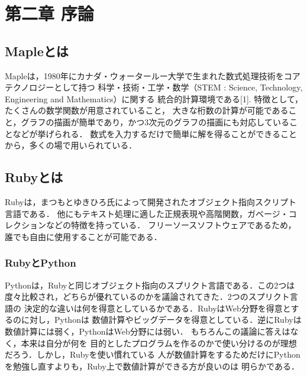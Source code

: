\section{第二章 序論}
\subsection{Mapleとは}
Mapleは，1980年にカナダ・ウォータールー大学で生まれた数式処理技術をコアテクノロジーとして持つ
科学・技術・工学・数学（STEM : Science, Technology, Engineering and Mathematics）に関する
統合的計算環境である[1].
特徴として，たくさんの数学関数が用意されていること，
大きな桁数の計算が可能であること，グラフの描画が簡単であり，かつ3次元のグラフの描画にも対応していることなどが挙げられる．
数式を入力するだけで簡単に解を得ることができることから，多くの場で用いられている．

\subsection{Rubyとは}
Rubyは，まつもとゆきひろ氏によって開発されたオブジェクト指向スクリプト言語である．
他にもテキスト処理に適した正規表現や高階関数，ガベージ・コレクションなどの特徴を持っている．
フリーソースソフトウェアであるため，誰でも自由に使用することが可能である．

\subsubsection{RubyとPython}
Pythonは，Rubyと同じオブジェクト指向のスプリクト言語である．この2つは
度々比較され，どちらが優れているのかを議論されてきた．2つのスプリクト言語の
決定的な違いは何を得意としているかである．RubyはWeb分野を得意とするのに対し，Pythonは
数値計算やビッグデータを得意としている．逆にRubyは数値計算には弱く，PythonはWeb分野には弱い．
もちろんこの議論に答えはなく，本来は自分が何を
目的としたプログラムを作るのかで使い分けるのが理想だろう．しかし，Rubyを使い慣れている
人が数値計算をするためだけにPythonを勉強し直すよりも，Ruby上で数値計算ができる方が良いのは
明らかである．

